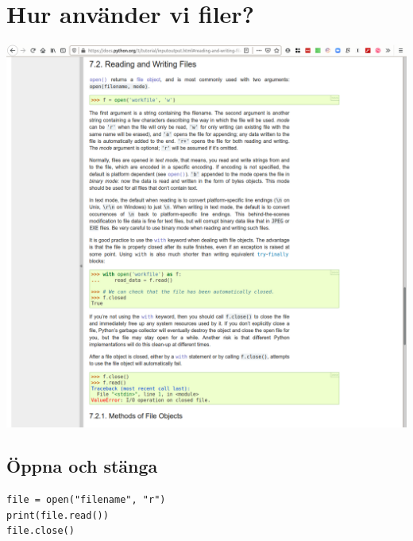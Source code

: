 \section{Hur använder vi filer?}

\begin{frame}
  \includegraphics[width=\columnwidth]{figs/docs-files.png}
\end{frame}

\subsection{Öppna och stänga}

\begin{frame}[fragile]
  \begin{verbatim}
file = open("filename", "r")
print(file.read())
file.close()
  \end{verbatim}
\end{frame}

\begin{frame}[fragile]
  \begin{example}
    \inputminted[firstline=3,lastline=16,firstnumber=3]{python}{examples/open_close.py}
  \end{example}
\end{frame}

